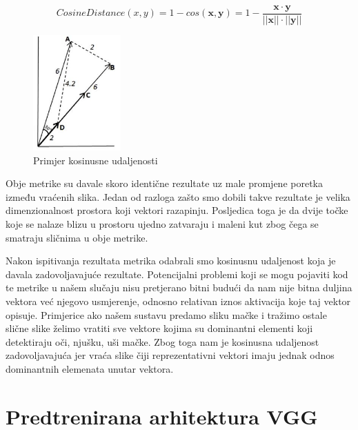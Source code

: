 \documentclass[times, utf8, proizvoljni, numeric]{fer}
\begin{document}
\begin{equation}
\label{eq:kosinusna_udaljenost}
CosineDistance(x,y) = 1- cos(\pmb x, \pmb y) = 1 - \frac {\pmb x \cdot \pmb y}{||\pmb x|| \cdot ||\pmb y||}
\end{equation}

\begin{figure}[!ht]
	\begin{center}
		\captionsetup{justification=centering}
		\includegraphics[width=0.3\textwidth]{./imgs/kosinusna_udaljenost.png}
		\caption{Primjer kosinusne udaljenosti \cite{VectorSimilarity}}
		\label{fg:kosinusna_udaljenost}
	\end{center}
\end{figure}

Obje metrike su davale skoro identične rezultate uz male promjene poretka između vraćenih slika. Jedan od razloga zašto smo dobili takve rezultate je velika dimenzionalnost prostora koji vektori razapinju. Posljedica toga je da dvije točke koje se nalaze blizu u prostoru ujedno zatvaraju i maleni kut zbog čega se smatraju sličnima u obje metrike.	

Nakon ispitivanja rezultata metrika odabrali smo kosinusnu udaljenost koja je davala zadovoljavajuće rezultate. Potencijalni problemi koji se mogu pojaviti kod te metrike u našem slučaju nisu pretjerano bitni budući da nam nije bitna duljina vektora već njegovo usmjerenje, odnosno relativan iznos aktivacija koje taj vektor opisuje. Primjerice ako našem sustavu predamo sliku mačke i tražimo ostale slične slike želimo vratiti sve vektore kojima su dominantni elementi koji detektiraju oči, njušku, uši mačke. Zbog toga nam je kosinusna udaljenost zadovoljavajuća jer vraća slike čiji reprezentativni vektori imaju jednak odnos dominantnih elemenata unutar vektora.


\section{Predtrenirana arhitektura VGG}
\end{document}
